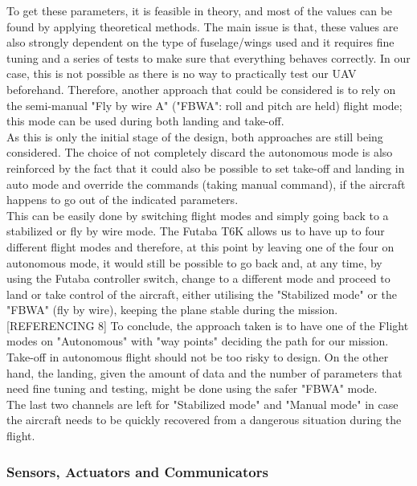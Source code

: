 \documentclass[12pt]{article}
\begin{document}
\noindent To get these parameters, it is feasible in theory, and most of the values can be found by applying theoretical methods. The main issue is that, these values are also strongly dependent on the type of fuselage/wings used and it requires fine tuning and a series of tests to make sure that everything behaves correctly. In our case, this is not possible as there is no way to practically test our UAV beforehand. Therefore, another approach that could be considered is to rely on the semi-manual "Fly by wire A" ("FBWA": roll and pitch are held) flight mode; this mode can be used during both landing and take-off. \\

\noindent As this is only the initial stage of the design, both approaches are still being considered. The choice of not completely discard the autonomous mode is also reinforced by the fact that it could also be possible to set take-off and landing in auto mode and override the commands (taking manual command), if the aircraft happens to go out of the indicated parameters. \\

\noindent This can be easily done by switching flight modes and simply going back to a stabilized or fly by wire mode. The Futaba T6K allows us to have up to four different flight modes and therefore, at this point by leaving one of the four on autonomous mode, it would still be possible to go back and, at any time, by using the Futaba controller switch, change to a different mode and proceed to land or take control of the aircraft, either utilising the "Stabilized mode" or the "FBWA" (fly by wire), keeping the plane stable during the mission.[REFERENCING 8] To conclude, the approach taken is to have one of the Flight modes on "Autonomous" with "way points" deciding the path for our mission. Take-off in autonomous flight should not be too risky to design. On the other hand, the landing, given the amount of data and the number of parameters that need fine tuning and testing, might be done using the safer "FBWA" mode. \\

\noindent The last two channels are left for "Stabilized mode" and "Manual mode" in case the aircraft needs to be quickly recovered from a dangerous situation during the flight. \\

\subsubsection{Sensors, Actuators and Communicators}
\end{document}
